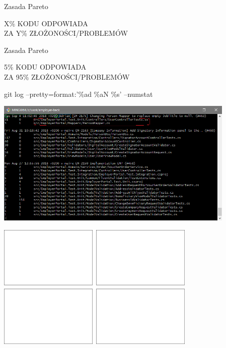 \documentclass{beamer}
\begin{document}
\begin{frame}{Zasada Pareto}
\begin{center}
\Large{{\color{red}X\%} KODU ODPOWIADA\\
ZA {\color{red}Y\%} ZŁOŻONOŚCI/PROBLEMÓW}
\end{center}
\end{frame}

\begin{frame}{Zasada Pareto}
\begin{center}
\Large{{\color{red}5\%} KODU ODPOWIADA\\
ZA {\color{red}95\%} ZŁOŻONOŚCI/PROBLEMÓW}
\end{center}
\end{frame}

\begin{frame}{git log --pretty=format:'\%ad \%aN \%s' --numstat}
\begin{center}
  	\includegraphics[height=6cm]{git_log.png}
\end{center}
\end{frame}

\begin{frame}{}
\begin{center}
  	\includegraphics[height=6cm]{git_log1.png}
\end{center}
\end{frame}
\end{document}
